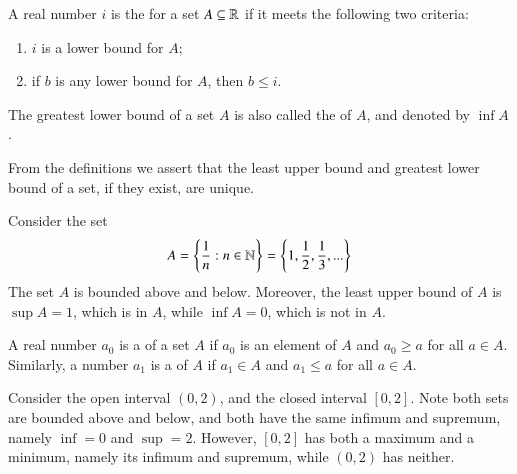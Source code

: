 \begin{defn}
    A real number $i$ is the  for a set $A \subseteq \mathbb R$ if it meets the following two criteria: \begin{enumerate}
        \item $i$ is a lower bound for $A$;
        \item if $b$ is any lower bound for $A$, then $b \leq i$.
    \end{enumerate}
    The greatest lower bound of a set $A$ is also called the  of $A$, and denoted by $\inf A$.
\end{defn}


\begin{rmk}
    From the definitions we assert that the least upper bound and greatest lower bound of a set, if they exist, are unique.
\end{rmk}


\begin{eg}
    Consider the set $$A = \left\{\frac{1}{n}:n\in\mathbb N\right\} = \left\{1,\frac{1}{2},\frac{1}{3},...\right\}$$ The set $A$ is bounded above and below. Moreover, the least upper bound of $A$ is $\sup A = 1$, which is in $A$, while $\inf A = 0$, which is not in $A$.
\end{eg}


\begin{defn}
    A real number $a_0$ is a  of a set $A$ if $a_0$ is an element of $A$ and $a_0 \geq a$ for all $a \in A$. Similarly, a number $a_1$ is a  of $A$ if $a_1 \in A$ and $a_1 \leq a$ for all $a \in A$.
\end{defn}

\begin{eg}
    Consider the open interval $(0,2)$, and the closed interval $[0,2]$. Note both sets are bounded above and below, and both have the same infimum and supremum, namely $\inf = 0$ and $\sup = 2$. However, $[0,2]$ has both a maximum and a minimum, namely its infimum and supremum, while $(0,2)$ has neither.
\end{eg}


